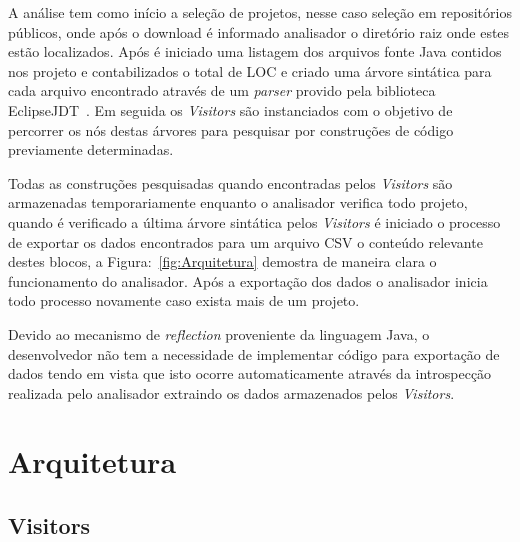 A análise tem como início a seleção de projetos, nesse caso seleção em repositórios públicos, onde após o download é informado analisador o diretório raiz onde estes estão localizados. Após é iniciado uma listagem dos arquivos fonte Java contidos nos projeto e contabilizados o total de \acs{LOC} e criado uma árvore sintática para cada arquivo encontrado através de um \textit{parser} provido pela biblioteca EclipseJDT~\cite{EclipseJDT}. Em seguida os \textit{Visitors} são instanciados com o objetivo de percorrer os nós destas árvores para pesquisar por construções de código previamente determinadas.

Todas as construções pesquisadas quando encontradas pelos \textit{Visitors} são armazenadas temporariamente enquanto o analisador verifica todo projeto, quando é verificado a última árvore sintática pelos \textit{Visitors} é iniciado o processo de exportar os dados encontrados para um arquivo \acs{CSV} o conteúdo relevante destes blocos, a Figura:~\ref{fig:Arquitetura} demostra de maneira clara o funcionamento do analisador. Após a exportação dos dados o analisador inicia todo processo novamente caso exista mais de um projeto.

Devido ao mecanismo de \textit{reflection} proveniente da linguagem Java, o desenvolvedor não tem a necessidade de implementar código para exportação de dados tendo em vista que isto ocorre automaticamente através da introspecção realizada pelo analisador extraindo os dados armazenados pelos \textit{Visitors}.



\section{Arquitetura}

\subsection{Visitors}

